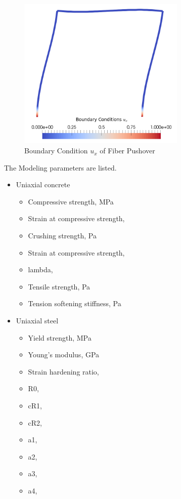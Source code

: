 \begin{figure}[H]
  \centering
  \includegraphics[width = 8cm]{./Figure-files/Day1/Pushover_for_Nonlinear_Frame/boundary_condition_frame.png}
  \caption{Boundary Condition $u_x$ of Fiber Pushover}
  \label{fig_day1_fiberbeam_pushover_results_bc}
\end{figure}

The Modeling parameters are listed.
\begin{itemize}
  \item Uniaxial concrete 
  \begin{itemize}
    \item Compressive strength,  \enspace {} MPa
    \item Strain at compressive strength,  \enspace {}
    \item Crushing strength,  \enspace {} Pa
    \item Strain at compressive strength,  \enspace {}
    \item lambda, \enspace {}
    \item Tensile strength, \enspace {} Pa
    \item Tension softening stiffness, \enspace {} Pa
  \end{itemize}
  \item Uniaxial steel
  \begin{itemize}
    \item Yield strength, \enspace {} MPa
    \item Young's modulus, \enspace {} GPa
    \item Strain hardening ratio, \enspace {}
    \item R0, \enspace {}
    \item cR1,  \enspace {}
    \item cR2,  \enspace {}
    \item a1, \enspace {}
    \item a2, \enspace {}
    \item a3, \enspace {}
    \item a4, \enspace {}
  \end{itemize}
\end{itemize}


